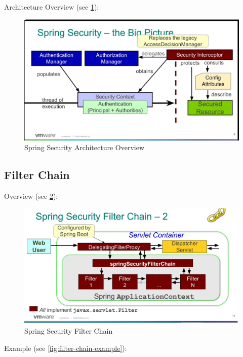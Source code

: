 \documentclass{scrartcl}
\begin{document}
Architecture Overview (see \ref{fig:spring-security}):

\begin{figure}[h]
    \centering
    \includegraphics[width=1\linewidth]{spring-security}
    \caption{Spring Security Architecture Overview}
    \label{fig:spring-security}
\end{figure}

\subsection{Filter Chain}

Overview (see \ref{fig:filter-chain}):

\begin{figure}
    \centering
    \includegraphics[width=1\linewidth]{filter-chain}
    \caption{Spring Security Filter Chain}
    \label{fig:filter-chain}
\end{figure}

Example (see \ref{fig:filter-chain-example}):
\end{document}
